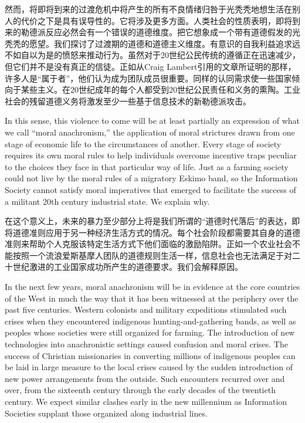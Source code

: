 \begin{paracol}{2}[]
\switchcolumn
然而，将即将到来的过渡危机中将产生的所有不良情绪归咎于光秃秃地想生活在别人的代价之下是具有误导性的。它将涉及更多方面。人类社会的性质表明，即将到来的勒德派反应必然会有一个错误的道德维度。把它想象成一个带有道德假发的光秃秃的愿望。我们探讨了过渡期的道德和道德主义维度。有意识的自我利益追求远不如自以为是的愤怒来推动行为。虽然对于20世纪公民传统的遵循正在迅速减少，但它们并不是没有真正的信徒。正如从Craig Lambert引用的文章所证明的那样，许多人是“属于者”，他们认为成为团队成员很重要。同样的认同需求使一些国家倾向于某些主义。在20世纪成年的每个人都受到20世纪公民责任和义务的熏陶。工业社会的残留道德义务将激发至少一些基于信息技术的新勒德派攻击。

\switchcolumn*
In this sense, this violence to come will be at least partially an expression of what we call ``moral anachronism,'' the application of moral strictures drawn from one stage of economic life to the circumstances of another. Every stage of society requires its own moral rules to help individuals overcome incentive traps peculiar to the choices they face in that particular way of life. Just as a farming society could not live by the moral rules of a migratory Eskimo band, so the Information Society cannot satisfy moral imperatives that emerged to facilitate the success of a militant 20th century industrial state. We explain why.

\switchcolumn
在这个意义上，未来的暴力至少部分上将是我们所谓的“道德时代落后”的表达，即将道德准则应用于另一种经济生活方式的情况。每个社会阶段都需要其自身的道德准则来帮助个人克服该特定生活方式下他们面临的激励陷阱。正如一个农业社会不能按照一个流浪爱斯基摩人团队的道德规则生活一样，信息社会也无法满足于对二十世纪激进的工业国家成功所产生的道德要求。我们会解释原因。

\switchcolumn*
In the next few years, moral anachronism will be in evidence at the core countries of the West in much the way that it has been witnessed at the periphery over the past five centuries. Western colonists and military expeditions stimulated such crises when they encountered indigenous hunting-and-gathering bands, as well as peoples whose societies were still organized for farming. The introduction of new technologies into anachronistic settings caused confusion and moral crises. The success of Christian missionaries in converting millions of indigenous peoples can be laid in large measure to the local crises caused by the sudden introduction of new power arrangements from the outside. Such encounters recurred over and over, from the sixteenth century through the early decades of the twentieth century. We expect similar clashes early in the new millennium as Information Societies supplant those organized along industrial lines.


\end{paracol}
